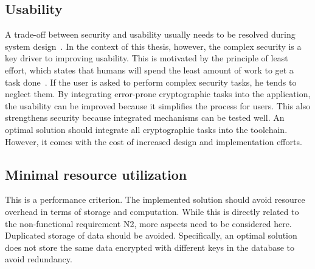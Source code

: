\documentclass[../main.tex]{subfiles}
\begin{document}
\subsection{Usability}
A trade-off between security and usability usually needs to be resolved during system design~\cite{Braz2007}.
In the context of this thesis, however, the complex security is a key driver to improving usability.
This is motivated by the principle of least effort, which states that humans will spend the least amount of work to get a task done~\cite{Levenson2018}.
If the user is asked to perform complex security tasks, he tends to neglect them.
By integrating error-prone cryptographic tasks into the application, the usability can be improved because it simplifies the process for users.
This also strengthens security because integrated mechanisms can be tested well.
An optimal solution should integrate all cryptographic tasks into the toolchain.
However, it comes with the cost of increased design and implementation efforts.

\subsection{Minimal resource utilization}
This is a performance criterion.
The implemented solution should avoid resource overhead in terms of storage and computation.
While this is directly related to the non-functional requirement N2, more aspects need to be considered here.
Duplicated storage of data should be avoided.
Specifically, an optimal solution does not store the same data encrypted with different keys in the database to avoid redundancy.
\end{document}
